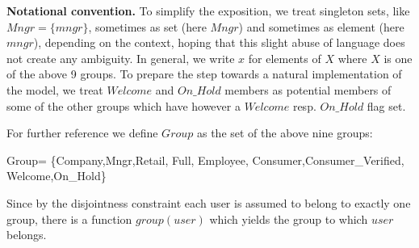 {\bf Notational convention.} To simplify the exposition, we treat singleton sets, like $Mngr=\{mngr\}$, sometimes as set (here $Mngr$) and sometimes as element (here $mngr$), depending on the context, hoping that this slight abuse of language does not create any ambiguity. 
In general, we write $x$ for elements of $X$ where $X$ is one of the above 9 groups. To prepare the step towards a natural implementation of the model, we treat $Welcome$ and $On\_Hold$ members as potential members of some of the other groups which have however a $Welcome$ resp. $On\_Hold$ flag set. 

For further reference we define $Group$ as the set of the above nine groups:
\begin{asm}
Group= \+
       \{Company,Mngr,Retail, Full, Employee,\+
             Consumer,Consumer\_Verified, Welcome,On\_Hold\}
\end{asm}

Since by the disjointness constraint each user is assumed to belong to exactly one group, there is a function $group(user)$ which yields the group to which $user$ belongs.

